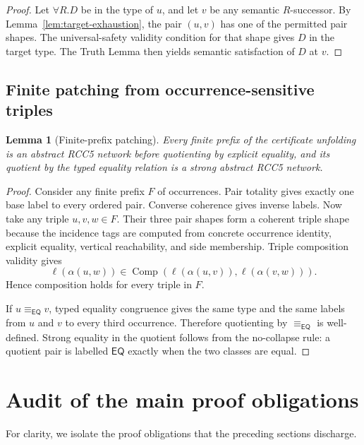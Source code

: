 \documentclass[11pt]{article}
\newtheorem{lemma}[theorem]{Lemma}
\newcommand{\EQ}{\mathsf{EQ}}
\newcommand{\comp}{\operatorname{Comp}}
\newcommand{\eqc}{\equiv_{\EQ}}
\begin{document}
\begin{proof}
Let $\forall R.D$ be in the type of $u$, and let $v$ be any semantic $R$-successor.  By Lemma~\ref{lem:target-exhaustion}, the pair $(u,v)$ has one of the permitted pair shapes.  The universal-safety validity condition for that shape gives $D$ in the target type.  The Truth Lemma then yields semantic satisfaction of $D$ at $v$.
\end{proof}

\subsection{Finite patching from occurrence-sensitive triples}

\begin{lemma}[Finite-prefix patching]\label{lem:finite-prefix-patching}
Every finite prefix of the certificate unfolding is an abstract RCC5 network before quotienting by explicit equality, and its quotient by the typed equality relation is a strong abstract RCC5 network.
\end{lemma}

\begin{proof}
Consider any finite prefix $F$ of occurrences.  Pair totality gives exactly one base label to every ordered pair.  Converse coherence gives inverse labels.  Now take any triple $u,v,w\in F$.  Their three pair shapes form a coherent triple shape because the incidence tags are computed from concrete occurrence identity, explicit equality, vertical reachability, and side membership.  Triple composition validity gives
\[
  \ell(\alpha(u,w))\in\comp(\ell(\alpha(u,v)),\ell(\alpha(v,w))).
\]
Hence composition holds for every triple in $F$.

If $u\eqc v$, typed equality congruence gives the same type and the same labels from $u$ and $v$ to every third occurrence.  Therefore quotienting by $\eqc$ is well-defined.  Strong equality in the quotient follows from the no-collapse rule: a quotient pair is labelled $\EQ$ exactly when the two classes are equal.
\end{proof}

\section{Audit of the main proof obligations}
\label{sec:audit}

For clarity, we isolate the proof obligations that the preceding sections discharge.
\end{document}
